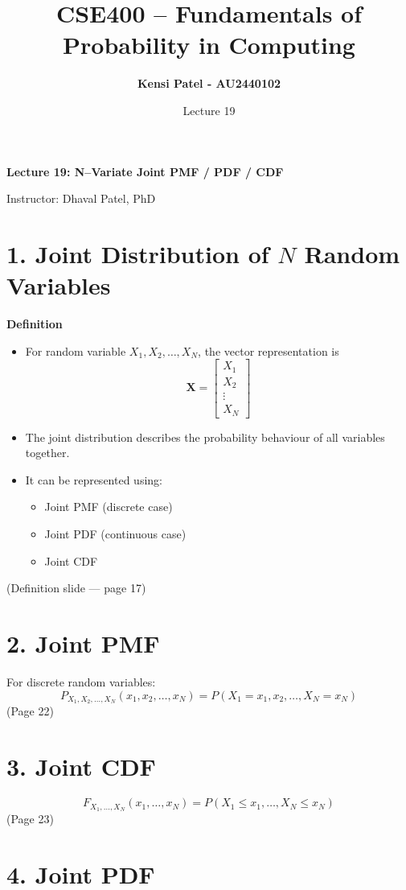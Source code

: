 \documentclass{article}
\title{\textbf{CSE400 – Fundamentals of Probability in Computing}}
\author{\textbf{Kensi Patel - AU2440102}}
\date{Lecture 19}
\begin{document}
\maketitle

\textbf{Lecture 19: N–Variate Joint PMF / PDF / CDF}

Instructor: Dhaval Patel, PhD

\section*{1. Joint Distribution of $N$ Random Variables}

\textbf{Definition}
\begin{itemize}
    \item For random variable $X_1,X_2,\ldots,X_N$, the vector representation is
\[\mathbf{X}=\begin{bmatrix}X_1\\X_2\\\vdots\\X_N\end{bmatrix}\]

    \item The joint distribution describes the probability behaviour of all variables together.
    \item It can be represented using:
    \begin{itemize}
        \item Joint PMF (discrete case)
        \item Joint PDF (continuous case)
        \item Joint CDF
    \end{itemize}
\end{itemize}
(Definition slide — page 17)

\section*{2. Joint PMF}

For discrete random variables:
\[P_{X_1,X_2,\ldots,X_N}(x_1,x_2,\ldots,x_N)=P(X_1=x_1,x_2,\ldots,X_N=x_N)\]
(Page 22)

\section*{3. Joint CDF}

\[F_{X_1,\ldots,X_N}(x_1,\ldots,x_N)=P(X_1\le x_1,\ldots,X_N\le x_N)\]
(Page 23)

\section*{4. Joint PDF}
\end{document}
